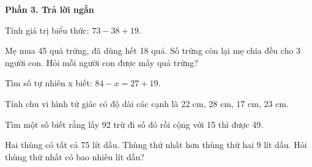 \textbf{Phần 3. Trả lời ngắn}

\begin{ex} %
Tính giá trị biểu thức: $73 - 38 + 19$.
\end{ex}

\begin{ex} %
Mẹ mua 45 quả trứng, đã dùng hết 18 quả. Số trứng còn lại mẹ chia đều cho 3 người con. Hỏi mỗi người con được mấy quả trứng?
\end{ex}

\begin{ex} %
Tìm số tự nhiên x biết: $84 - x = 27 + 19$.
\end{ex}

\begin{ex} %
Tính chu vi hình tứ giác có độ dài các cạnh là 22 cm, 28 cm, 17 cm, 23 cm.
\end{ex}

\begin{ex} %
Tìm một số biết rằng lấy 92 trừ đi số đó rồi cộng với 15 thì được 49.
\end{ex}

\begin{ex} %
Hai thùng có tất cả 75 lít dầu. Thùng thứ nhất hơn thùng thứ hai 9 lít dầu. Hỏi thùng thứ nhất có bao nhiêu lít dầu?
\end{ex}
